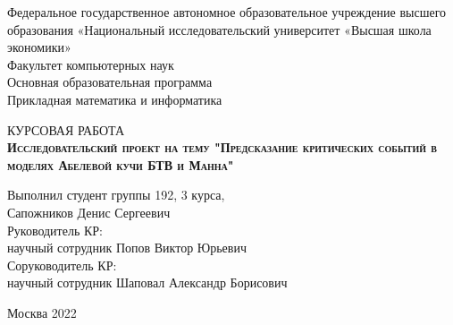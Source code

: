\begin{titlepage}
\newpage

{
\begin{center}
Федеральное государственное автономное образовательное учреждение высшего образования «Национальный исследовательский университет «Высшая школа экономики»
\\
\bigskip
Факультет компьютерных наук \\
Основная образовательная программа \\
Прикладная математика и информатика \\
\end{center}
}

\vspace{8em}

\begin{center}
{\Large КУРСОВАЯ РАБОТА}\\
\textsc{\textbf{
Исследовательский проект на тему
\linebreak
"Предсказание критических событий в моделях Абелевой кучи БТВ и Манна"}}
\end{center}

\vspace{2em}

{
\hfill\parbox{16cm}{
\hspace*{5cm}\hspace*{-5cm}Выполнил студент группы 192, 3 курса,\\
 Сапожников Денис Сергеевич\\
 
\hspace*{5cm}\hspace*{-5cm}Руководитель КР:\\
научный сотрудник Попов Виктор Юрьевич\\


\hspace*{5cm}\hspace*{-5cm}Соруководитель КР:\\
научный сотрудник Шаповал Александр Борисович\\
}
}

\vspace{\fill}

\begin{center}
Москва 2022
\end{center}

\end{titlepage}